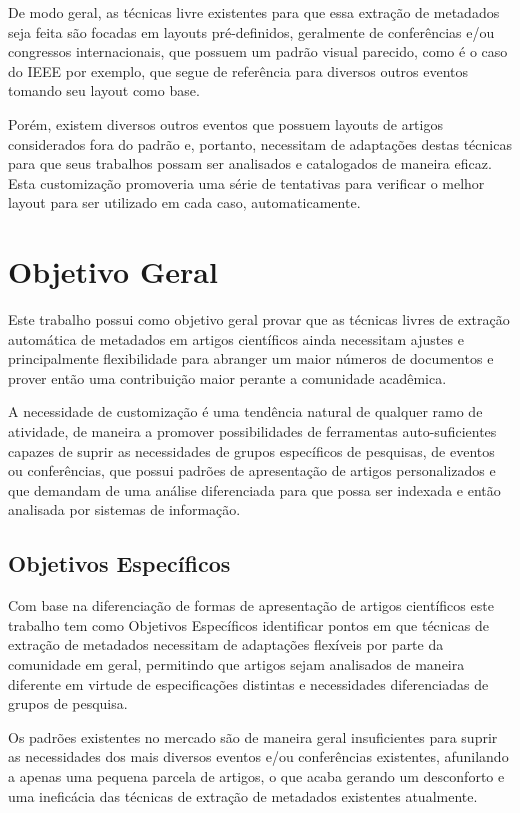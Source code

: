 \documentclass[
	12pt,               %
	openright,          %
	twoside,            %
	a4paper,            %
	english,            %
	brazil              %
	]{abntex2}
\begin{document}
De modo geral, as técnicas livre existentes para que essa extração de metadados seja feita são focadas em layouts pré-definidos, geralmente de conferências e/ou congressos internacionais, que possuem um padrão visual parecido, como é o caso do IEEE por exemplo, que segue de referência para diversos outros eventos tomando seu layout como base.

Porém, existem diversos outros eventos que possuem layouts de artigos considerados fora do padrão e, portanto, necessitam de adaptações destas técnicas para que seus trabalhos possam ser analisados e catalogados de maneira eficaz. Esta customização promoveria uma série de tentativas para verificar o melhor layout para ser utilizado em cada caso, automaticamente.

\section{Objetivo Geral}

Este trabalho possui como objetivo geral provar que as técnicas livres de extração automática de metadados em artigos científicos ainda necessitam ajustes e principalmente flexibilidade para abranger um maior números de documentos e prover então uma contribuição maior perante a comunidade acadêmica.

A necessidade de customização é uma tendência natural de qualquer ramo de atividade, de maneira a promover possibilidades de ferramentas auto-suficientes capazes de suprir as necessidades de grupos específicos de pesquisas, de eventos ou conferências, que possui padrões de apresentação de artigos personalizados e que demandam de uma análise diferenciada para que possa ser indexada e então analisada por sistemas de informação.

\subsection{Objetivos Específicos}

Com base na diferenciação de formas de apresentação de artigos científicos este trabalho tem como Objetivos Específicos identificar pontos em que técnicas de extração de metadados necessitam de adaptações flexíveis por parte da comunidade em geral, permitindo que artigos sejam analisados de maneira diferente em virtude de especificações distintas e necessidades diferenciadas de grupos de pesquisa.

Os padrões existentes no mercado são de maneira geral insuficientes para suprir as necessidades dos mais diversos eventos e/ou conferências existentes, afunilando a apenas uma pequena parcela de artigos, o que acaba gerando um desconforto e uma ineficácia das técnicas de extração de metadados existentes atualmente.
\end{document}
